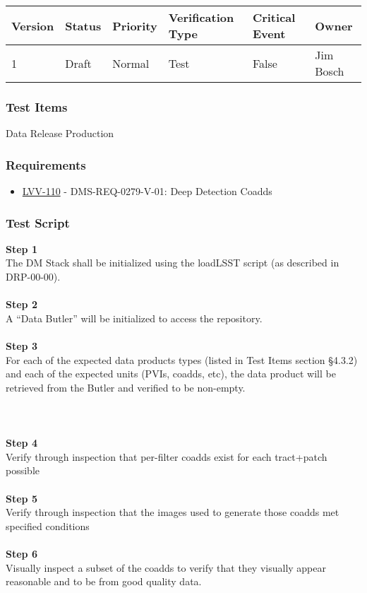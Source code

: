 \begin{longtable}[]{@{}llllll@{}}
\toprule
Version & Status & Priority & Verification Type & Critical Event &
Owner\tabularnewline
\midrule
\endhead
1 & Draft & Normal & Test & False & Jim Bosch\tabularnewline
\bottomrule
\end{longtable}

\hypertarget{test-items-49}{%
\subsubsection{Test Items}\label{test-items-49}}

Data Release Production

\hypertarget{requirements-50}{%
\subsubsection{Requirements}\label{requirements-50}}

\begin{itemize}
\tightlist
\item
  \href{https://jira.lsstcorp.org/browse/LVV-110}{LVV-110} -
  DMS-REQ-0279-V-01: Deep Detection Coadds
\end{itemize}

\hypertarget{test-script-50}{%
\subsubsection{Test Script}\label{test-script-50}}

\textbf{Step 1}\\
The DM Stack shall be initialized using the loadLSST script (as
described in DRP-00-00).\\
~\\
\textbf{Step 2}\\
A ``Data Butler'' will be initialized to access the repository.\\
~\\
\textbf{Step 3}\\
For each of the expected data products types (listed in Test Items
section §4.3.2) and each of the expected units (PVIs, coadds, etc), the
data product will be retrieved from the Butler and verified to be
non-empty.\\
~\\
~\\
~\\
\textbf{Step 4}\\
Verify through inspection that per-filter coadds exist for each
tract+patch possible\\
~\\
\textbf{Step 5}\\
Verify through inspection that the images used to generate those coadds
met specified conditions\\
~\\
\textbf{Step 6}\\
Visually inspect a subset of the coadds to verify that they visually
appear reasonable and to be from good quality data.\\
~\\

